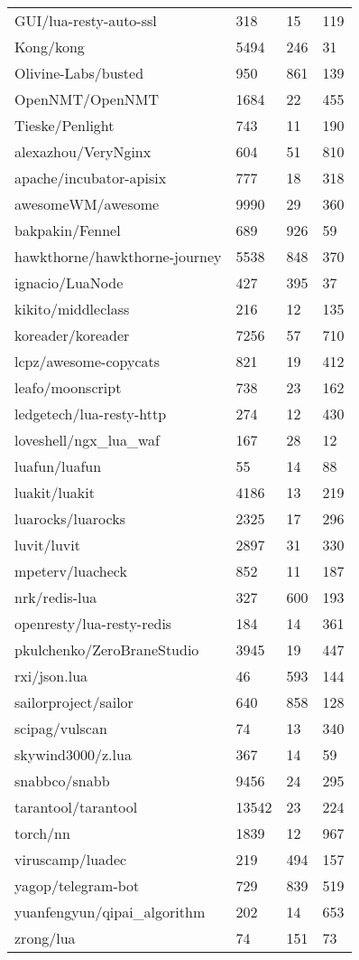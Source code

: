 \begin{center}
\begin{supertabular}{llll}
GUI/lua-resty-auto-ssl & 318 & 15 & 119 \\
Kong/kong & 5494 & 246 & 31 \\
Olivine-Labs/busted & 950 & 861 & 139 \\
OpenNMT/OpenNMT & 1684 & 22 & 455 \\
Tieske/Penlight & 743 & 11 & 190 \\
alexazhou/VeryNginx & 604 & 51 & 810 \\
apache/incubator-apisix & 777 & 18 & 318 \\
awesomeWM/awesome & 9990 & 29 & 360 \\
bakpakin/Fennel & 689 & 926 & 59 \\
hawkthorne/hawkthorne-journey & 5538 & 848 & 370 \\
ignacio/LuaNode & 427 & 395 & 37 \\
kikito/middleclass & 216 & 12 & 135 \\
koreader/koreader & 7256 & 57 & 710 \\
lcpz/awesome-copycats & 821 & 19 & 412 \\
leafo/moonscript & 738 & 23 & 162 \\
ledgetech/lua-resty-http & 274 & 12 & 430 \\
loveshell/ngx\_lua\_waf & 167 & 28 & 12 \\
luafun/luafun & 55 & 14 & 88 \\
luakit/luakit & 4186 & 13 & 219 \\
luarocks/luarocks & 2325 & 17 & 296 \\
luvit/luvit & 2897 & 31 & 330 \\
mpeterv/luacheck & 852 & 11 & 187 \\
nrk/redis-lua & 327 & 600 & 193 \\
openresty/lua-resty-redis & 184 & 14 & 361 \\
pkulchenko/ZeroBraneStudio & 3945 & 19 & 447 \\
rxi/json.lua & 46 & 593 & 144 \\
sailorproject/sailor & 640 & 858 & 128 \\
scipag/vulscan & 74 & 13 & 340 \\
skywind3000/z.lua & 367 & 14 & 59 \\
snabbco/snabb & 9456 & 24 & 295 \\
tarantool/tarantool & 13542 & 23 & 224 \\
torch/nn & 1839 & 12 & 967 \\
viruscamp/luadec & 219 & 494 & 157 \\
yagop/telegram-bot & 729 & 839 & 519 \\
yuanfengyun/qipai\_algorithm & 202 & 14 & 653 \\
zrong/lua & 74 & 151 & 73 \\
\bottomrule
\end{supertabular}
\end{center}


